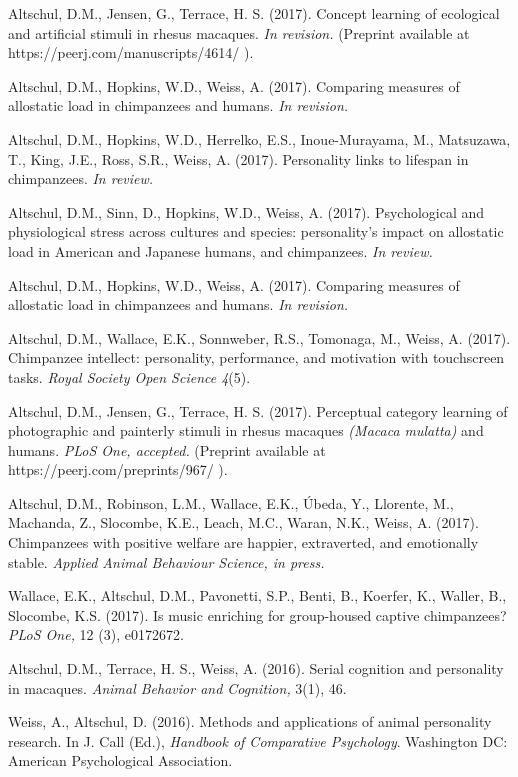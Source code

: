 \documentclass[margin,line]{res}
\begin{document}
\begin{resume}

Altschul, D.M., Jensen, G.,  Terrace, H. S. (2017). Concept learning of ecological and artificial stimuli in rhesus macaques. {\it In revision.} (Preprint available at https://peerj.com/manuscripts/4614/ ).

Altschul, D.M., Hopkins, W.D., Weiss, A. (2017). Comparing measures of allostatic load in chimpanzees and humans. {\it In revision.}

Altschul, D.M., Hopkins, W.D., Herrelko, E.S., Inoue-Murayama, M., Matsuzawa, T., King, J.E., Ross, S.R., Weiss, A. (2017). Personality links to lifespan in chimpanzees. {\it In review.} 

Altschul, D.M., Sinn, D., Hopkins, W.D., Weiss, A. (2017). Psychological and physiological stress across cultures and species: personality's impact on allostatic load in American and Japanese humans, and chimpanzees. {\it In review.} 

Altschul, D.M., Hopkins, W.D., Weiss, A. (2017). Comparing measures of allostatic load in chimpanzees and humans. {\it In revision.}

Altschul, D.M., Wallace, E.K., Sonnweber, R.S., Tomonaga, M., Weiss, A. (2017). Chimpanzee intellect: personality, performance, and motivation with touchscreen tasks. {\it Royal Society Open Science 4}(5).

Altschul, D.M., Jensen, G.,  Terrace, H. S. (2017). Perceptual category learning of photographic and painterly stimuli in rhesus macaques {\it (Macaca mulatta)} and humans.  {\it PLoS One, accepted.} (Preprint available at https://peerj.com/preprints/967/ ).

Altschul, D.M., Robinson, L.M., Wallace, E.K., \'{U}beda, Y., Llorente, M., Machanda, Z., Slocombe, K.E., Leach, M.C., Waran, N.K., Weiss, A. (2017). Chimpanzees with positive welfare are happier, extraverted, and emotionally stable. {\it Applied Animal Behaviour Science, in press.}

Wallace, E.K., Altschul, D.M., Pavonetti, S.P., Benti, B., Koerfer, K., Waller, B., Slocombe, K.S. (2017). Is music enriching for group-housed captive chimpanzees?  {\it PLoS One,} 12 (3), e0172672.

Altschul, D.M., Terrace, H. S., Weiss, A. (2016). Serial cognition and personality in macaques. {\it Animal Behavior and Cognition,} 3(1), 46.

Weiss, A., Altschul, D. (2016). Methods and applications of animal personality research. In J. Call (Ed.), {\it Handbook of Comparative Psychology}. Washington DC: American Psychological Association.


\end{resume}
\end{document}
